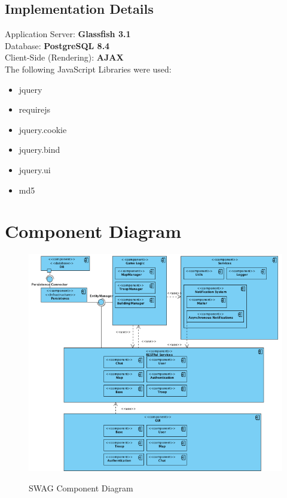 \documentclass[a4paper]{article}
\begin{document}
\subsection{Implementation Details}

Application Server: \textbf{Glassfish 3.1}\\
Database: \textbf{PostgreSQL 8.4}\\
Client-Side (Rendering): \textbf{AJAX}\\

The following JavaScript Libraries were used:
\begin{itemize}
\item jquery
\item requirejs
\item jquery.cookie
\item jquery.bind
\item jquery.ui
\item md5
\end{itemize}


\clearpage

\section{Component Diagram}

\begin{figure}[ht!]
  \begin{center}
  \hspace*{-90pt}
  \includegraphics[scale=0.60]{fig/components.png}
  \label{fig:component_diagram}
  \caption{SWAG Component Diagram}
  \end{center}
\end{figure}
\end{document}
